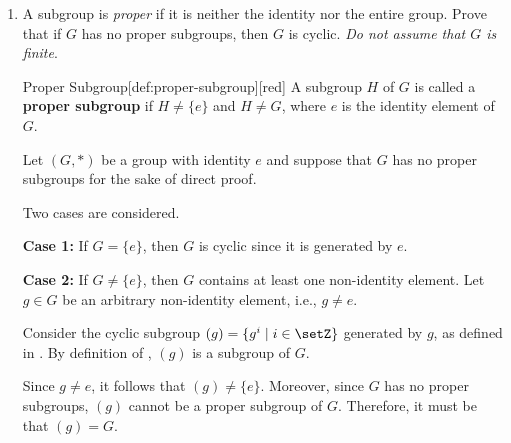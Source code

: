 \begin{enumerate}
\begin{subprove}
    However, since $d$ is the smallest positive integer such that $g^d \in H$ and $0 \leq r < d$, 
    the only possibility is that $r = 0$.
    Therefore, $h = (g^d)^q \in (g^d)$.
    Since $h$ was arbitrary, it is concluded that $H \subseteq (g^d)$.
    
    To show that $(g^d) \subseteq H$, since $g^d \in H$ and $H$ is a subgroup, 
    it follows by closure under the group operation that $(g^d) = \{(g^d)^i \mid i \in \setZ\} \subseteq H$.
    
    Therefore, $H = (g^d)$, and hence $H$ is cyclic by definition of .
    
    In both cases, it is shown that $H$ is cyclic.
    Since $H$ was an arbitrary subgroup of $G$, it follows that every subgroup of $G$ is cyclic.
  \end{subprove}





  \newpage
  
  \item A subgroup is \textit{proper} if it is neither the identity 
  nor the entire group. Prove that if $G$ has no proper subgroups, 
  then $G$ is cyclic. \textit{Do not assume that $G$ is finite}.
  \begin{define}{Proper Subgroup}[def:proper-subgroup][red]
    A subgroup $H$ of $G$ is called a \textbf{proper subgroup} if $H \neq \{e\}$ and $H \neq G$, 
    where $e$ is the identity element of $G$.
  \end{define}
  \begin{subprove}
    Let $(G, *)$ be a group with identity $e$ and suppose that $G$ has no proper subgroups for the sake of direct proof.
    
    Two cases are considered.
    
    \textbf{Case 1:} If $G = \{e\}$, then $G$ is cyclic since it is generated by $e$.
    
    \textbf{Case 2:} If $G \neq \{e\}$, then $G$ contains at least one non-identity element.
    Let $g \in G$ be an arbitrary non-identity element, i.e., $g \neq e$.
    
    Consider the cyclic subgroup $(g) = \{g^i \mid i \in \setZ\}$ generated by $g$, 
    as defined in .
    By definition of , $(g)$ is a subgroup of $G$.
    
    Since $g \neq e$, it follows that $(g) \neq \{e\}$.
    Moreover, since $G$ has no proper subgroups, $(g)$ cannot be a proper subgroup of $G$.
    Therefore, it must be that $(g) = G$.
    

\end{subprove}
\end{enumerate}
